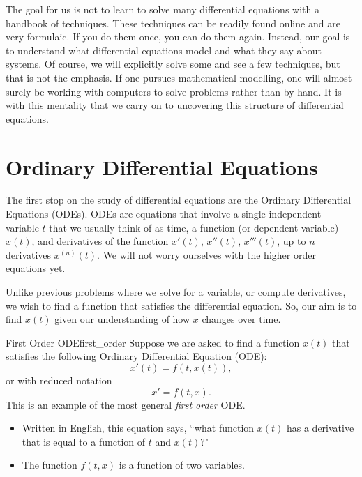         The goal for us is not to learn to solve many differential equations with a handbook of techniques.  These techniques can be readily found online and are very formulaic.  If you do them once, you can do them again.  Instead, our goal is to understand what differential equations model and what they say about systems.  Of course, we will explicitly solve some and see a few techniques, but that is not the emphasis.  If one pursues mathematical modelling, one will almost surely be working with computers to solve problems rather than by hand. It is with this mentality that we carry on to uncovering this structure of differential equations.
        
        \section{Ordinary Differential Equations}
        
        The first stop on the study of differential equations are the Ordinary Differential Equations  (ODEs).  ODEs are equations that involve a single independent variable $t$ that we usually think of as time, a function (or dependent variable) $x(t)$, and derivatives of the function $x'(t)$, $x''(t)$, $x'''(t)$, up to $n$ derivatives $x^{(n)}(t)$.  We will not worry ourselves with the higher order equations yet.
        
        Unlike previous problems where we solve for a variable, or compute derivatives, we wish to find a function that satisfies the differential equation.  So, our aim is to find $x(t)$ given our understanding of how $x$ changes over time.
        
        \begin{ex}{First Order ODE}{first_order}
        Suppose we are asked to find a function $x(t)$ that satisfies the following Ordinary Differential Equation (ODE):
        \[
        x'(t) = f(t,x(t)),
        \]
        or with reduced notation
        \[
        x'=f(t,x).
        \]
        This is an example of the most general \emph{first order} ODE. 
        \begin{itemize}
            \item Written in English, this equation says, ``what function $x(t)$ has a derivative that is equal to a function of $t$ and $x(t)$?"
            \item The function $f(t,x)$ is a function of two variables. 
        \end{itemize}
        \end{ex}
        
